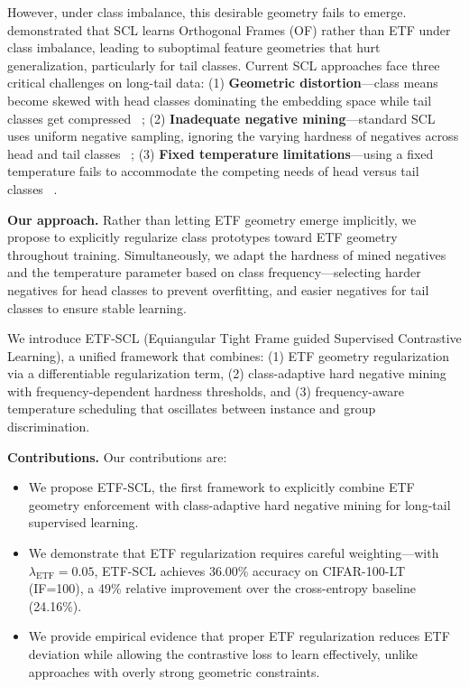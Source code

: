 \documentclass{article}
\begin{document}
However, under class imbalance, this desirable geometry fails to emerge. \citet{kini2023supervised} demonstrated that SCL learns Orthogonal Frames (OF) rather than ETF under class imbalance, leading to suboptimal feature geometries that hurt generalization, particularly for tail classes. Current SCL approaches face three critical challenges on long-tail data: (1) \textbf{Geometric distortion}---class means become skewed with head classes dominating the embedding space while tail classes get compressed~
\citep{dang2023neural}; (2) \textbf{Inadequate negative mining}---standard SCL uses uniform negative sampling, ignoring the varying hardness of negatives across head and tail classes~
\citep{jiang2022supervised}; (3) \textbf{Fixed temperature limitations}---using a fixed temperature fails to accommodate the competing needs of head versus tail classes~
\citep{kukleva2023temperature}.

\textbf{Our approach.} Rather than letting ETF geometry emerge implicitly, we propose to explicitly regularize class prototypes toward ETF geometry throughout training. Simultaneously, we adapt the hardness of mined negatives and the temperature parameter based on class frequency---selecting harder negatives for head classes to prevent overfitting, and easier negatives for tail classes to ensure stable learning.

We introduce ETF-SCL (Equiangular Tight Frame guided Supervised Contrastive Learning), a unified framework that combines: (1) ETF geometry regularization via a differentiable regularization term, (2) class-adaptive hard negative mining with frequency-dependent hardness thresholds, and (3) frequency-aware temperature scheduling that oscillates between instance and group discrimination.

\textbf{Contributions.} Our contributions are:
\begin{itemize}
    \item We propose ETF-SCL, the first framework to explicitly combine ETF geometry enforcement with class-adaptive hard negative mining for long-tail supervised learning.
    \item We demonstrate that ETF regularization requires careful weighting---with $\lambda_{\text{ETF}} = 0.05$, ETF-SCL achieves 36.00\% accuracy on CIFAR-100-LT (IF=100), a 49\% relative improvement over the cross-entropy baseline (24.16\%).
    \item We provide empirical evidence that proper ETF regularization reduces ETF deviation while allowing the contrastive loss to learn effectively, unlike approaches with overly strong geometric constraints.
\end{itemize}
\end{document}

